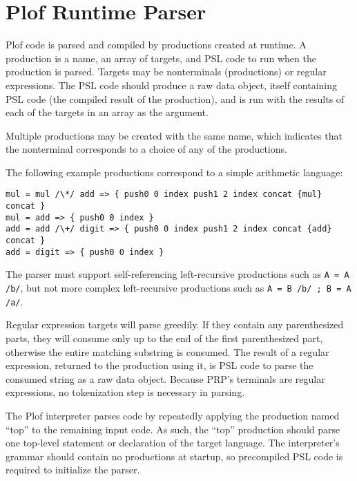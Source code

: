 \chapter{Plof Runtime Parser}

Plof code is parsed and compiled by productions created at runtime. A production is a name, an array of targets, and PSL code to run when the production is parsed. Targets may be nonterminals (productions) or regular expressions. The PSL code should produce a raw data object, itself containing PSL code (the compiled result of the production), and is run with the results of each of the targets in an array as the argument.

Multiple productions may be created with the same name, which indicates that the nonterminal corresponds to a choice of any of the productions.

The following example productions correspond to a simple arithmetic language:

\begin{verbatim}
mul = mul /\*/ add => { push0 0 index push1 2 index concat {mul} concat }
mul = add => { push0 0 index }
add = add /\+/ digit => { push0 0 index push1 2 index concat {add} concat }
add = digit => { push0 0 index }
\end{verbatim}

The parser must support self-referencing left-recursive productions such as \texttt{A = A /b/}, but not more complex left-recursive productions such as \texttt{A = B /b/ ; B = A /a/}.

Regular expression targets will parse greedily. If they contain any parenthesized parts, they will consume only up to the end of the first parenthesized part, otherwise the entire matching substring is consumed. The result of a regular expression, returned to the production using it, is PSL code to parse the consumed string as a raw data object. Because PRP's terminals are regular expressions, no tokenization step is necessary in parsing.

The Plof interpreter parses code by repeatedly applying the production named ``top'' to the remaining input code. As such, the ``top'' production should parse one top-level statement or declaration of the target language. The interpreter's grammar should contain no productions at startup, so precompiled PSL code is required to initialize the parser.
